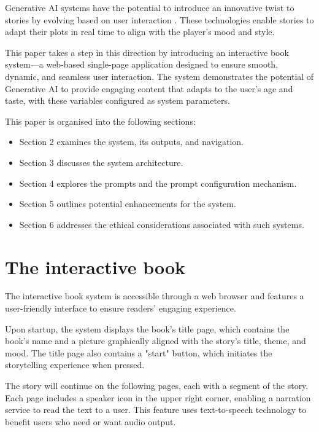 \documentclass[conference]{IEEEtran}
\begin{document}
	
	Generative AI systems have the potential to introduce an innovative twist to stories by evolving based on user interaction\cite{vidrih2023generative} \cite{fotedar2020storytelling}. These technologies enable stories to adapt their plots in real time to align with the player’s mood and style.
	
	This paper takes a step in this direction by introducing an interactive book system—a web-based single-page application designed to ensure smooth, dynamic, and seamless user interaction. The system demonstrates the potential of Generative AI to provide engaging content that adapts to the user's age and taste, with these variables configured as system parameters.
	
	This paper is organised into the following sections:
	
	\begin{itemize}
		
		\item Section 2 examines the system, its outputs, and navigation.
		\item Section 3 discusses the system architecture.
		\item Section 4 explores the prompts and the prompt configuration mechanism.
		\item Section 5 outlines potential enhancements for the system.
		\item Section 6 addresses the ethical considerations associated with such systems.
		
	\end{itemize}
	
	
	\section{The interactive book}
	
	The interactive book system is accessible through a web browser and features a user-friendly interface to ensure readers' engaging experience.
	
	Upon startup, the system displays the book's title page, which contains the book's name and a picture graphically aligned with the story's title, theme, and mood. The title page also contains a "start" button, which initiates the storytelling experience when pressed.
	
	The story will continue on the following pages, each with a segment of the story. Each page includes a speaker icon in the upper right corner, enabling a narration service to read the text to a user. This feature uses text-to-speech technology to benefit users who need or want audio output.
	
\end{document}
